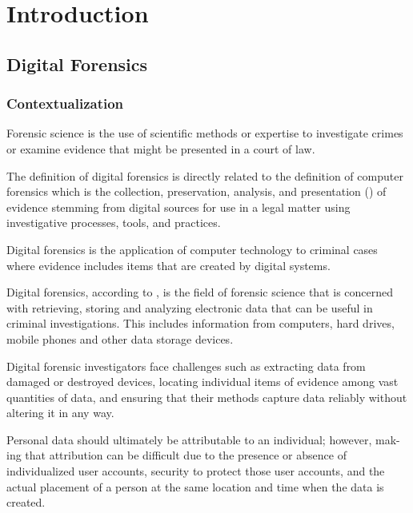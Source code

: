 
\chapter{Introduction}
\label{ch:introduction}

\section{Digital Forensics}

\subsection{Contextualization}

Forensic science is the use of scientific methods or expertise to investigate crimes
or examine evidence that might be presented in a court of law.

The definition of digital forensics is directly related to the definition of
computer forensics which is the collection, preservation, analysis,
and presentation () of evidence stemming from digital sources for use in a legal matter
using investigative processes, tools, and practices.

Digital forensics is the application of computer technology to criminal cases where evidence
includes items that are created by digital systems.

Digital forensics, according to \citeauthor{nist}, is the field of forensic science that is concerned with retrieving,
storing and analyzing electronic data that can be useful in criminal investigations.
This includes information from computers, hard drives, mobile phones and other data
storage devices.

Digital forensic investigators face challenges such as extracting data from damaged or destroyed
devices, locating individual items of evidence among vast quantities of data,
and ensuring that their methods capture data reliably without altering it in any way.

Personal data should ultimately be attributable to an individual; however, mak-
ing that attribution can be difficult due to the presence or absence of individualized
user accounts, security to protect those user accounts, and the actual placement of a
person at the same location and time when the data is created.

